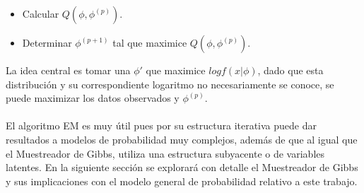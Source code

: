 \begin{itemize}
\item Calcular $Q(\phi,\phi^{(p)})$.
\item Determinar $\phi^{(p+1)}$ tal que maximice $Q(\phi,\phi^{(p)})$.
\end{itemize}
La idea central es tomar una $\phi'$ que maximice $log f(x|\phi)$, dado que esta distribuci\'on y su correspondiente logaritmo no necesariamente se conoce, se puede maximizar los datos observados y $\phi^{(p)}$.\\
\\
El algoritmo EM es muy \'util pues por su estructura iterativa puede dar resultados a modelos de probabilidad muy complejos, adem\'as de que al igual que el Muestreador de Gibbs, utiliza una estructura subyacente o de variables latentes. En la siguiente secci\'on se explorar\'a con detalle el Muestreador de Gibbs y sus implicaciones con el modelo general de probabilidad relativo a este trabajo.
